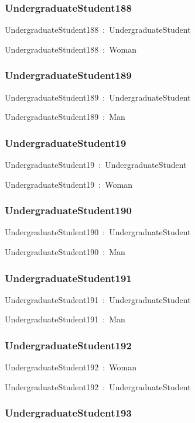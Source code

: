 \documentclass{article}
\begin{document}
\subsubsection*{UndergraduateStudent188}

UndergraduateStudent188~:~UndergraduateStudent

UndergraduateStudent188~:~Woman

\subsubsection*{UndergraduateStudent189}

UndergraduateStudent189~:~UndergraduateStudent

UndergraduateStudent189~:~Man

\subsubsection*{UndergraduateStudent19}

UndergraduateStudent19~:~UndergraduateStudent

UndergraduateStudent19~:~Woman

\subsubsection*{UndergraduateStudent190}

UndergraduateStudent190~:~UndergraduateStudent

UndergraduateStudent190~:~Man

\subsubsection*{UndergraduateStudent191}

UndergraduateStudent191~:~UndergraduateStudent

UndergraduateStudent191~:~Man

\subsubsection*{UndergraduateStudent192}

UndergraduateStudent192~:~Woman

UndergraduateStudent192~:~UndergraduateStudent

\subsubsection*{UndergraduateStudent193}
\end{document}
